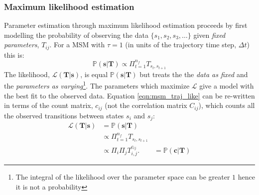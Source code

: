 \subsubsection{Maximum likelihood estimation}
Parameter estimation through maximum likelihood estimation proceeds by first modelling  the probability of observing the data $\{s_{1}, s_{2}, s_{3}, \ldots \}$ given \emph{fixed parameters}, $T_{ij}$. For a MSM  with  $\tau=1$ (in units of the trajectory time step, $\Delta t$) this is: 
\begin{equation}\label{eqn:msm_traj_like}
    \mathbb{P}(\mathbf{s}|\mathbf{T}) \propto \Pi_{t=1}^{n_{f}} T_{s_{t}, s_{t+1}}
\end{equation}
The likelihood, $\mathcal{L}(\mathbf{T}|\mathbf{s})$, is equal $\mathbb{P}(\mathbf{s}|\mathbf{T})$ but treats the the \emph{data as fixed} and the \emph{parameters as varying}\footnote{The integral of the likelihood over the parameter space can be greater $1$ hence it is not a probability}. The parameters which maximize $\mathcal{L}$ give a model with the best fit to the observed data. Equation \ref{eqn:msm_traj_like} can be re-written in terms of the count matrix, $c_{ij}$ (not the correlation matrix $C_{ij}$), which counts all the observed transitions between states $s_i$ and $s_j$: 
\begin{align}
    \mathcal{L}(\mathbf{T}|\mathbf{s}) & = \mathbb{P}(\mathbf{s}|\mathbf{T}) \\
    & \propto \Pi_{t=1}^{n_{f}} T_{s_{t}, s_{t+1}} \\ 
    & \propto \Pi_{i}\Pi_{j}T_{i, j}^{c_{ij}}. \label{eqn:msm_count_like}
    & = \mathbb{P}(\mathbf{c}|\mathbf{T})
\end{align}

